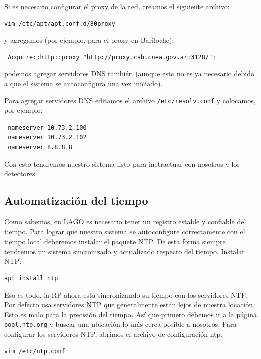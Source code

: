 \documentclass[a4paper,11pt]{article}
\begin{document}
\noindent Si es necesario configurar el proxy de la red, creamos el siguiente archivo:

\begin{verbatim}
vim /etc/apt/apt.conf.d/80proxy
\end{verbatim}

\noindent y agregamos (por ejemplo, para el proxy en Bariloche):

\begin{verbatim}
 Acquire::http::proxy "http://proxy.cab.cnea.gov.ar:3128/";
\end{verbatim}

\noindent podemos agregar servidores DNS también (aunque esto no es ya necesario
debido a que el sistema se autoconfigura una vez iniciado). 

Para agregar servidores DNS editamos el archivo \texttt{/etc/resolv.conf} y
colocamos, por ejemplo:

\begin{verbatim}
 nameserver 10.73.2.100
 nameserver 10.73.2.102
 nameserver 8.8.8.8
\end{verbatim}

\noindent Con esto tendremos nuestro sistema listo para inetractuar con nosotros
y los detectores.

\subsection{Automatización del tiempo}
Como sabemos, en LAGO es necesario tener un registro estable y confiable del
tiempo. Para lograr que nuestro sistema se autoconfigure correctamente con el
tiempo local deberemos instalar el paquete NTP. De esta forma siempre tendremos
un sistema sincronizado y actualizado respecto del tiempo. Instalar NTP:

\begin{verbatim}
apt install ntp
\end{verbatim}

\noindent Eso es todo, la RP ahora está sincronizando su tiempo con los servidores NTP. Por
defecto usa servidores NTP que generalmente están lejos de nuestra locación.
Esto es malo para la precisión del tiempo. Así que primero debemos ir a la página
\texttt{pool.ntp.org} y buscar una ubicación lo más cerca posible a nosotros.
Para configurar los servidores NTP,
abrimos el archivo de configuración ntp.

\begin{verbatim}
vim /etc/ntp.conf
\end{verbatim}
\end{document}
